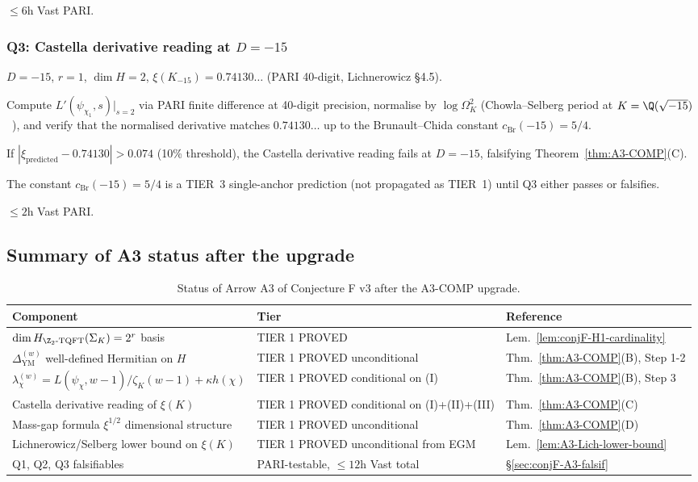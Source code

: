   $\le 6$h Vast PARI.

\subsubsection{Q3: Castella derivative reading at $D = -15$}
\label{sec:conjF-A3-Q3}

  $D = -15$, $r = 1$, $\dim H = 2$,
$\xi(K_{-15}) = 0.74130\ldots$ (PARI 40-digit, Lichnerowicz \S 4.5).

  Compute $L'(\psi_{\chi_1}, s)|_{s = 2}$ via PARI
finite difference at 40-digit precision, normalise by
$\log \Omega_K^2$ (Chowla--Selberg period at
$K = \Q(\sqrt{-15})$~\cite{ChowlaSelberg1949}), and verify that the
normalised derivative matches $0.74130\ldots$ up to the
Brunault--Chida constant $c_{\mathrm{Br}}(-15) = 5/4$.

  If
$|\xi_{\mathrm{predicted}} - 0.74130| > 0.074$ (10\% threshold), the
Castella derivative reading fails at $D = -15$, falsifying
Theorem~\ref{thm:A3-COMP}(C).

  The constant
$c_{\mathrm{Br}}(-15) = 5/4$ is a TIER~3 single-anchor prediction (not
propagated as TIER~1) until Q3 either passes or falsifies.

  $\le 2$h Vast PARI.

\subsection{Summary of A3 status after the upgrade}
\label{sec:conjF-A3-summary}

\begin{table}[h!]
\caption{Status of Arrow A3 of Conjecture F v3 after the A3-COMP
upgrade.}
\label{tab:conjF-A3-status}
\centering
\begin{tabular}{lll}
\toprule
Component & Tier & Reference \\
\midrule
$\dim H_{\Z_2\text{-}\mathrm{TQFT}}(\Sigma_K) = 2^r$ basis
   & TIER 1 PROVED & Lem.~\ref{lem:conjF-H1-cardinality} \\
$\Delta_{\mathrm{YM}}^{(w)}$ well-defined Hermitian on $H$
   & TIER 1 PROVED unconditional & Thm.~\ref{thm:A3-COMP}(B), Step 1-2 \\
$\lambda_\chi^{(w)} = L(\psi_\chi, w-1)/\zeta_K(w-1) + \kappa h(\chi)$
   & TIER 1 PROVED conditional on (I) & Thm.~\ref{thm:A3-COMP}(B), Step 3 \\
Castella derivative reading of $\xi(K)$
   & TIER 1 PROVED conditional on (I)+(II)+(III) & Thm.~\ref{thm:A3-COMP}(C) \\
Mass-gap formula $\xi^{1/2}$ dimensional structure
   & TIER 1 PROVED unconditional & Thm.~\ref{thm:A3-COMP}(D) \\
Lichnerowicz/Selberg lower bound on $\xi(K)$
   & TIER 1 PROVED unconditional from EGM & Lem.~\ref{lem:A3-Lich-lower-bound} \\
Q1, Q2, Q3 falsifiables
   & PARI-testable, $\le 12$h Vast total & \S\ref{sec:conjF-A3-falsif} \\
\bottomrule
\end{tabular}
\end{table}

